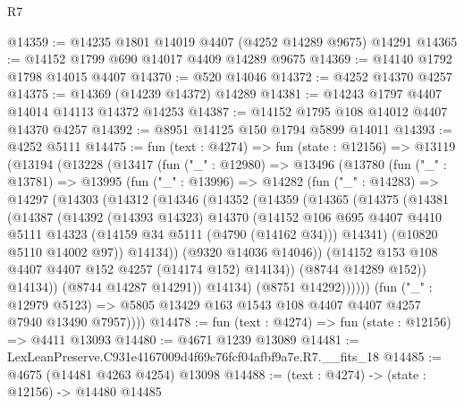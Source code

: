 \begin{lexlean}{R7}
\begin{coremodule}
@14359 := @14235 @1801 @14019 @4407 (@4252 @14289 @9675) @14291
@14365 := @14152 @1799 @690 @14017 @4409 @14289 @9675
@14369 := @14140 @1792 @1798 @14015 @4407
@14370 := @520 @14046
@14372 := @4252 @14370 @4257
@14375 := @14369 (@14239 @14372) @14289
@14381 := @14243 @1797 @4407 @14014 @14113 @14372 @14253
@14387 := @14152 @1795 @108 @14012 @4407 @14370 @4257
@14392 := @8951 @14125 @150 @1794 @5899 @14011
@14393 := @4252 @5111
@14475 := fun (text : @4274) =>
  fun (state : @12156) =>
  @13119
    (@13194
      (@13228
        (@13417
          (fun ("_" : @12980) =>
          @13496
            (@13780
              (fun ("_" : @13781) =>
              @13995
                (fun ("_" : @13996) =>
                @14282
                  (fun ("_" : @14283) =>
                  @14297
                    (@14303
                      (@14312
                        (@14346
                          (@14352
                            (@14359
                              (@14365
                                (@14375
                                  (@14381
                                    (@14387
                                      (@14392
                                        (@14393 @14323)
                                        @14370
                                        (@14152
                                          @106
                                          @695
                                          @4407
                                          @4410
                                          @5111
                                          @14323
                                          (@14159 @34 @5111 (@4790 (@14162 @34)))
                                          @14341)
                                        (@10820 @5110 @14002 @97))
                                      @14134))
                                  (@9320 @14036 @14046))
                                (@14152 @153 @108 @4407 @4407 @152 @4257 (@14174 @152) @14134))
                              (@8744 @14289 @152))
                            @14134))
                        (@8744 @14287 @14291))
                      @14134)
                    (@8751 @14292))))))
          (fun ("_" : @12979 @5123) =>
          @5805 @13429 @163 @1543 @108 @4407 @4407 @4257 @7940 @13490 @7957))))
@14478 := fun (text : @4274) => fun (state : @12156) => @4411 @13093
@14480 := @4671 @1239 @13089
@14481 := LexLeanPreserve.C931e4167009d4f69c76fcf04afbf9a7e.R7.__fits_18
@14485 := @4675 (@14481 @4263 @4254) @13098
@14488 := (text : @4274) -> (state : @12156) -> @14480 @14485

\end{coremodule}
\end{lexlean}
